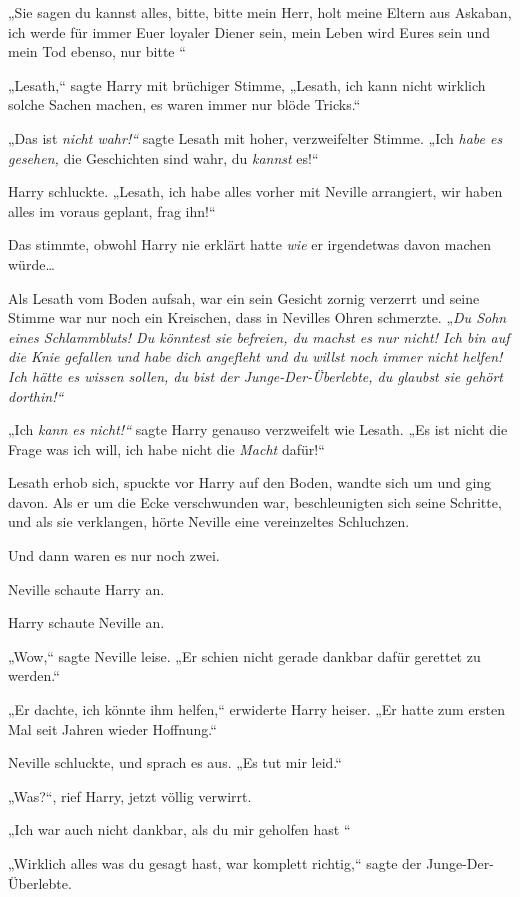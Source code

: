 {„Sie sagen du kannst alles, bitte, bitte mein Herr, holt meine Eltern aus Askaban, ich werde für immer Euer loyaler Diener sein, mein Leben wird Eures sein und mein Tod ebenso, nur bitte \later“

„Lesath,“ sagte Harry mit brüchiger Stimme, „Lesath, ich kann nicht wirklich solche Sachen machen, es waren immer nur blöde Tricks.“

„Das ist \emph{nicht wahr!“} sagte Lesath mit hoher, verzweifelter Stimme. „Ich \emph{habe es gesehen,} die Geschichten sind wahr, du \emph{kannst} es!“

Harry schluckte. „Lesath, ich habe alles vorher mit Neville arrangiert, wir haben alles im voraus geplant, frag ihn!“

Das stimmte, obwohl Harry nie erklärt hatte \emph{wie} er irgendetwas davon machen würde…

Als Lesath vom Boden aufsah, war ein sein Gesicht zornig verzerrt und seine Stimme war nur noch ein Kreischen, dass in Nevilles Ohren schmerzte. „\emph{Du Sohn eines Schlammbluts! Du könntest sie befreien, du machst es nur nicht! Ich bin auf die Knie gefallen und habe dich angefleht und du willst noch immer nicht helfen! Ich hätte es wissen sollen, du bist der Junge-Der-Überlebte, du glaubst sie gehört} \emph{dorthin!“}

„Ich \emph{kann es nicht!“} sagte Harry genauso verzweifelt wie Lesath. „Es ist nicht die Frage was ich will, ich habe nicht die \emph{Macht} dafür!“

Lesath erhob sich, spuckte vor Harry auf den Boden, wandte sich um und ging davon. Als er um die Ecke verschwunden war, beschleunigten sich seine Schritte, und als sie verklangen, hörte Neville eine vereinzeltes Schluchzen.

Und dann waren es nur noch zwei.

Neville schaute Harry an.

Harry schaute Neville an.

„Wow,“ sagte Neville leise. „Er schien nicht gerade dankbar dafür gerettet zu werden.“

„Er dachte, ich könnte ihm helfen,“ erwiderte Harry heiser. „Er hatte zum ersten Mal seit Jahren wieder Hoffnung.“

Neville schluckte, und sprach es aus. „Es tut mir leid.“

„Was?“, rief Harry, jetzt völlig verwirrt.

„Ich war auch nicht dankbar, als du mir geholfen hast \later“

„Wirklich alles was du gesagt hast, war komplett richtig,“ sagte der Junge-Der-Überlebte.

}
